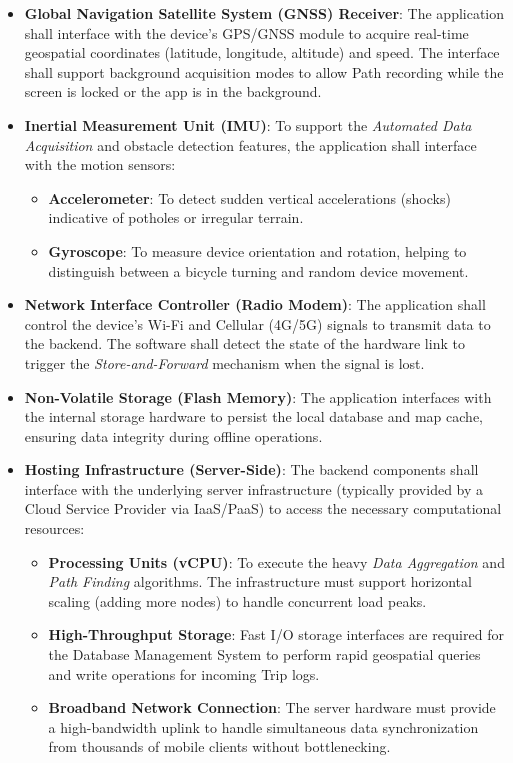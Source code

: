 \begin{itemize}
    \item \textbf{Global Navigation Satellite System (GNSS) Receiver}:
    The application shall interface with the device's GPS/GNSS module to acquire real-time geospatial coordinates (latitude, longitude, altitude) and speed. The interface shall support background acquisition modes to allow Path recording while the screen is locked or the app is in the background.

    \item \textbf{Inertial Measurement Unit (IMU)}:
    To support the \emph{Automated Data Acquisition} and obstacle detection features, the application shall interface with the motion sensors:
    \begin{itemize}
        \item \textbf{Accelerometer}: To detect sudden vertical accelerations (shocks) indicative of potholes or irregular terrain.
        \item \textbf{Gyroscope}: To measure device orientation and rotation, helping to distinguish between a bicycle turning and random device movement.
    \end{itemize}

    \item \textbf{Network Interface Controller (Radio Modem)}:
    The application shall control the device's Wi-Fi and Cellular (4G/5G) signals to transmit data to the backend. The software shall detect the state of the hardware link to trigger the \emph{Store-and-Forward} mechanism when the signal is lost.

    \item \textbf{Non-Volatile Storage (Flash Memory)}:
    The application interfaces with the internal storage hardware to persist the local database and map cache, ensuring data integrity during offline operations.

    \item \textbf{Hosting Infrastructure (Server-Side)}:
    The backend components shall interface with the underlying server infrastructure (typically provided by a Cloud Service Provider via IaaS/PaaS) to access the necessary computational resources:
    \begin{itemize}
        \item \textbf{Processing Units (vCPU)}: To execute the heavy \emph{Data Aggregation} and \emph{Path Finding} algorithms. The infrastructure must support horizontal scaling (adding more nodes) to handle concurrent load peaks.
        \item \textbf{High-Throughput Storage}: Fast I/O storage interfaces are required for the Database Management System to perform rapid geospatial queries and write operations for incoming Trip logs.
        \item \textbf{Broadband Network Connection}: The server hardware must provide a high-bandwidth uplink to handle simultaneous data synchronization from thousands of mobile clients without bottlenecking.
    \end{itemize}
\end{itemize}

